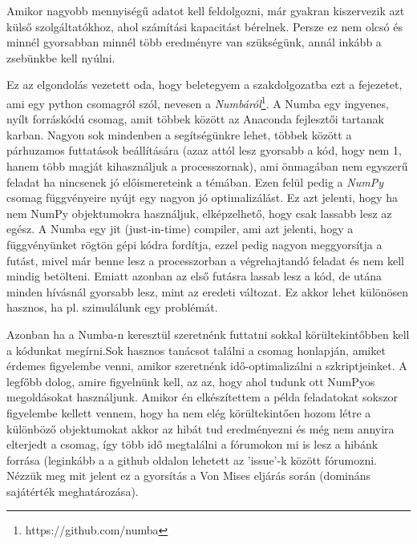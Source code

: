 \documentclass{article}
\theoremstyle{definition}
\theoremstyle{theorem}
\begin{document}
Amikor nagyobb mennyiségű adatot kell feldolgozni, már gyakran kiszervezik azt külső szolgáltatókhoz, ahol számítási kapacitást bérelnek. Persze ez nem olcsó és minnél gyorsabban minnél több eredményre van szükségünk, annál inkább a zsebünkbe kell nyúlni.

Ez az elgondolás vezetett oda, hogy beletegyem a szakdolgozatba ezt a fejezetet, ami egy python csomagról szól, nevesen a \textit{Numbáról}\footnote{https://github.com/numba}.
\newline
A Numba egy ingyenes, nyílt forráskódú csomag, amit többek között az Anaconda fejlesztői tartanak karban. Nagyon sok mindenben a segítségünkre lehet, többek között a párhuzamos futtatások beállítására (azaz attól lesz gyorsabb a kód, hogy nem 1, hanem több magját kihasználjuk a processzornak), ami önmagában nem egyszerű feladat ha nincsenek jó előismereteink a témában. Ezen felül pedig a \textit{NumPy} csomag függvényeire nyújt egy nagyon jó optimalizálást. Ez azt jelenti, hogy ha nem NumPy objektumokra használjuk, elképzelhető, hogy csak lassabb lesz az egész.\newline
A Numba egy jit (just-in-time) compiler, ami azt jelenti, hogy a függvényünket rögtön gépi kódra fordítja, ezzel pedig nagyon meggyorsítja a futást, mivel már benne lesz a processzorban a végrehajtandó feladat és nem kell mindig betölteni. Emiatt azonban az első futásra lassab lesz a kód, de utána minden hívásnál gyorsabb lesz, mint az eredeti változat. Ez akkor lehet különösen hasznos, ha pl. szimulálunk egy problémát.


Azonban ha a Numba-n keresztül szeretnénk futtatni sokkal körültekintőbben kell a kódunkat megírni.Sok hasznos tanácsot találni a csomag honlapján, amiket érdemes figyelembe venni, amikor szeretnénk idő-optimalizálni a szkriptjeinket. A legfőbb dolog, amire figyelnünk kell, az az, hogy ahol tudunk ott NumPyos megoldásokat használjunk. Amikor én elkészítettem a példa feladatokat sokszor figyelembe kellett vennem, hogy ha nem elég körültekintően hozom létre a különböző objektumokat akkor az hibát tud eredményezni és még nem annyira elterjedt a csomag, így több idő megtalálni a fórumokon mi is lesz a hibánk forrása (leginkább a a github oldalon lehetett az 'issue'-k között fórumozni.\newline
Nézzük meg mit jelent ez a gyorsítás a Von Mises eljárás során (domináns sajátérték meghatározása).
\end{document}
